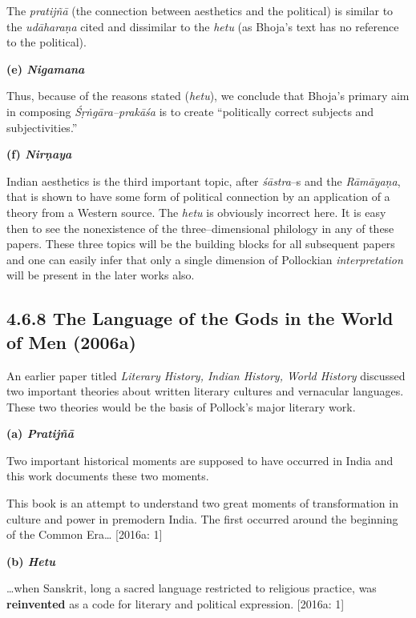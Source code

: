 The \textit{pratijñā} (the connection between aesthetics and the political) is similar to the \textit{udāharaṇa} cited and dissimilar to the \textit{hetu} (as Bhoja’s text has no reference to the political).

\textbf{(e) \textit{Nigamana}}

Thus, because of the reasons stated (\textit{hetu}), we conclude that Bhoja’s primary aim in composing \textit{Śṛṅgāra–prakāśa} is to create “politically correct subjects and subjectivities.”

\textbf{(f) \textit{Nirṇaya}}

Indian aesthetics is the third important topic, after \textit{śāstra}–s and the \textit{Rāmāyaṇa}, that is shown to have some form of political connection by an application of a theory from a Western source. The \textit{hetu} is obviously incorrect here. It is easy then to see the nonexistence of the three–dimensional philology in any of these papers. These three topics will be the building blocks for all subsequent papers and one can easily infer that only a single dimension of Pollockian \textit{interpretation} will be present in the later works also.


\subsection*{4.6.8 The Language of the Gods in the World of Men (2006a)}

An earlier paper titled \textit{Literary History, Indian History, World History }discussed two important theories about written literary cultures and vernacular languages. These two theories would be the basis of Pollock’s major literary work.

\textbf{(a) \textit{Pratijñā }}

Two important historical moments are supposed to have occurred in India and this work documents these two moments.

\begin{myquote}
This book is an attempt to understand two great moments of transformation in culture and power in premodern India. The ﬁrst occurred around the beginning of the Common Era… [2016a: 1]
\end{myquote}

\textbf{(b) \textit{Hetu}}

\begin{myquote}
…when Sanskrit, long a sacred language restricted to religious practice, was \textbf{reinvented} as a code for literary and political expression. [2016a: 1]
\end{myquote}

